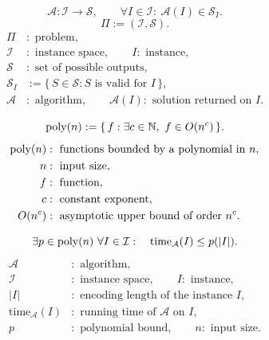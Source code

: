 \documentclass[12pt,a4paper]{article}
\begin{document}
\begin{definition}[Algorithm]
\[
\mathcal A:\mathcal I\to\mathcal S,
\qquad
\forall I\in\mathcal I:\ \mathcal A(I)\in\mathcal S_I.
\]
\[
\Pi:=(\mathcal I,\mathcal S).
\]
\[
\begin{aligned}
\Pi&:\text{ problem},\\
\mathcal I&:\text{ instance space},\qquad I:\text{ instance},\\
\mathcal S&:\text{ set of possible outputs},\\
\mathcal S_I&:=\{\,S\in\mathcal S:S\text{ is valid for }I\,\},\\
\mathcal A&:\text{ algorithm},\qquad
\mathcal A(I):\text{ solution returned on }I.
\end{aligned}
\]
\end{definition}

\begin{definition}[Polynomial]
\[
\poly(n):=\{\,f:\exists c\in\mathbb N,\ f\in O(n^{c})\,\}.
\]
\[
\begin{aligned}
\operatorname{poly}(n)&:\text{ functions bounded by a polynomial in }n,\\
n&:\text{ input size},\\
f&:\text{ function},\\
c&:\text{ constant exponent},\\
O(n^c)&:\text{ asymptotic upper bound of order }n^c.
\end{aligned}
\]
\end{definition}

\begin{definition}
\end{definition}

\noindent\begin{minipage}{\linewidth}
\begin{definition}
\[
\exists p\in\operatorname{poly}(n)\ \forall I\in\mathcal I:
\quad \mathrm{time}_{\mathcal A}(I)\leq p(|I|).
\]
\[
\begin{aligned}
\mathcal A&:\text{ algorithm},\\
\mathcal I&:\text{ instance space},\qquad I:\text{ instance},\\
|I|&:\text{ encoding length of the instance }I,\\
\mathrm{time}_{\mathcal A}(I)&:\text{ running time of }\mathcal A\text{ on }I,\\
p&:\text{ polynomial bound},\qquad n:\text{ input size}.
\end{aligned}
\]
\end{definition}
\end{minipage}\par
\end{document}
